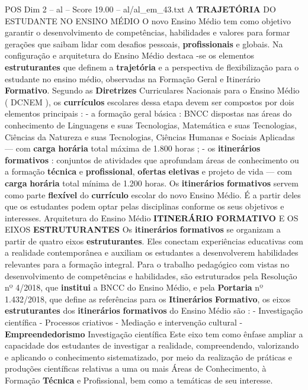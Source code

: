 \begin{textsample}{POS Dim 2 – al – Score 19.00 – al/al\_em\_43.txt}  \label{ex:f2_pos_269}
A \textbf{TRAJETÓRIA} DO ESTUDANTE NO ENSINO MÉDIO O novo Ensino Médio tem como objetivo garantir o desenvolvimento de competências, habilidades e valores para formar gerações que saibam lidar com desafios pessoais, \textbf{profissionais} e globais.
Na configuração e arquitetura do Ensino Médio destaca -se os elementos \textbf{estruturantes} que definem a \textbf{trajetória} e a perspectiva de flexibilização para o estudante no ensino médio, observadas na Formação Geral e Itinerário \textbf{Formativo}.
Segundo as \textbf{Diretrizes} Curriculares Nacionais para o Ensino Médio ( DCNEM ), os \textbf{currículos} escolares dessa etapa devem ser compostos por dois elementos principais : - a formação geral básica : BNCC dispostas nas áreas do conhecimento de Linguagens e suas Tecnologias, Matemática e suas Tecnologias, Ciências da Natureza e suas Tecnologias, Ciências Humanas e Sociais Aplicadas — com \textbf{carga} \textbf{horária} total máxima de 1.800 horas ; - os \textbf{itinerários} \textbf{formativos} : conjuntos de atividades que aprofundam áreas de conhecimento ou a formação \textbf{técnica} e \textbf{profissional}, \textbf{ofertas} \textbf{eletivas} e projeto de vida — com \textbf{carga} \textbf{horária} total mínima de 1.200 horas.
Os \textbf{itinerários} \textbf{formativos} servem como parte \textbf{flexível} do \textbf{currículo} escolar do novo Ensino Médio.
É a partir deles que os estudantes podem optar pelas disciplinas conforme os seus objetivos e interesses.
Arquitetura do Ensino Médio \textbf{ITINERÁRIO} \textbf{FORMATIVO} E OS EIXOS \textbf{ESTRUTURANTES} Os \textbf{itinerários} \textbf{formativos} se organizam a partir de quatro eixos \textbf{estruturantes}.
Eles conectam experiências educativas com a realidade contemporânea e auxiliam os estudantes a desenvolverem habilidades relevantes para a formação integral.
Para o trabalho pedagógico com vistas no desenvolvimento de competências e habilidades, são estruturados pela Resolução nº 4/2018, que \textbf{institui} a BNCC do Ensino Médio, e pela \textbf{Portaria} nº 1.432/2018, que define as referências para os \textbf{Itinerários} \textbf{Formativo}, os eixos \textbf{estruturantes} dos \textbf{itinerários} \textbf{formativos} do Ensino Médio são : - Investigação científica - Processos criativos - Mediação e intervenção cultural - \textbf{Empreendedorismo} Investigação científica Este eixo tem como ênfase ampliar a capacidade dos estudantes de investigar a realidade, compreendendo, valorizando e aplicando o conhecimento sistematizado, por meio da realização de práticas e produções científicas relativas a uma ou mais Áreas de Conhecimento, à Formação \textbf{Técnica} e Profissional, bem como a temáticas de seu interesse.

\end{textsample}
